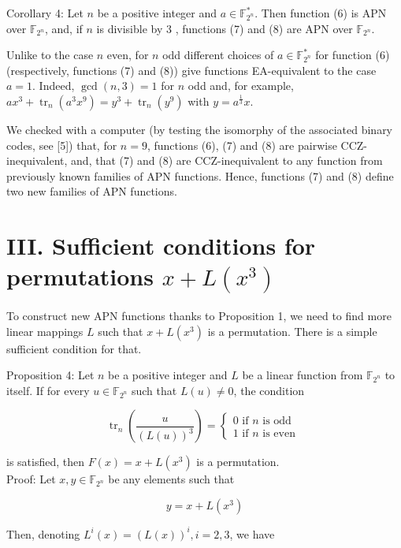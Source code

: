 \documentclass[10pt]{article}
\begin{document}
Corollary 4: Let $n$ be a positive integer and $a \in \mathbb{F}_{2^{n}}^{*}$. Then function (6) is APN over $\mathbb{F}_{2^{n}}$, and, if $n$ is divisible by 3 , functions (7) and (8) are APN over $\mathbb{F}_{2^{n}}$.

Unlike to the case $n$ even, for $n$ odd different choices of $a \in \mathbb{F}_{2^{n}}^{*}$ for function (6) (respectively, functions (7) and (8)) give functions EA-equivalent to the case $a=1$. Indeed, $\operatorname{gcd}(n, 3)=1$ for $n$ odd and, for example, $a x^{3}+\operatorname{tr}_{n}\left(a^{3} x^{9}\right)= y^{3}+\operatorname{tr}_{n}\left(y^{9}\right)$ with $y=a^{\frac{1}{3}} x$.

We checked with a computer (by testing the isomorphy of the associated binary codes, see [5]) that, for $n=9$, functions (6), (7) and (8) are pairwise CCZ-inequivalent, and, that (7) and (8) are CCZ-inequivalent to any function from previously known families of APN functions. Hence, functions (7) and (8) define two new families of APN functions.

\section*{III. Sufficient conditions for permutations $x+L\left(x^{3}\right)$}
To construct new APN functions thanks to Proposition 1, we need to find more linear mappings $L$ such that $x+L\left(x^{3}\right)$ is a permutation. There is a simple sufficient condition for that.

Proposition 4: Let $n$ be a positive integer and $L$ be a linear function from $\mathbb{F}_{2^{n}}$ to itself. If for every $u \in \mathbb{F}_{2^{n}}$ such that $L(u) \neq 0$, the condition

$$
\operatorname{tr}_{n}\left(\frac{u}{(L(u))^{3}}\right)=\left\{\begin{array}{l}
0 \text { if } n \text { is odd } \\
1 \text { if } n \text { is even }
\end{array}\right.
$$

is satisfied, then $F(x)=x+L\left(x^{3}\right)$ is a permutation.\\
Proof: Let $x, y \in \mathbb{F}_{2^{n}}$ be any elements such that


\begin{equation*}
y=x+L\left(x^{3}\right) \tag{12}
\end{equation*}


Then, denoting $L^{i}(x)=(L(x))^{i}, i=2,3$, we have
\end{document}

